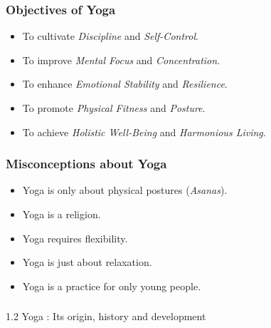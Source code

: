 \begin{frame}[fragile]\frametitle{Objectives of Yoga}

      \begin{itemize}
		\item To cultivate \textit{Discipline} and \textit{Self-Control}.
		\item To improve \textit{Mental Focus} and \textit{Concentration}.
		\item To enhance \textit{Emotional Stability} and \textit{Resilience}.
		\item To promote \textit{Physical Fitness} and \textit{Posture}.
		\item To achieve \textit{Holistic Well-Being} and \textit{Harmonious Living}.
	  \end{itemize}

\end{frame}

\begin{frame}[fragile]\frametitle{Misconceptions about Yoga}

      \begin{itemize}
		\item Yoga is only about physical postures (\textit{Asanas}).
		\item Yoga is a religion.
		\item Yoga requires flexibility.
		\item Yoga is just about relaxation.
		\item Yoga is a practice for only young people.
	  \end{itemize}

\end{frame}


\begin{frame}[fragile]\frametitle{}
\begin{center}
{\Large 1.2 Yoga : Its origin, history and development}
\end{center}
\end{frame}


